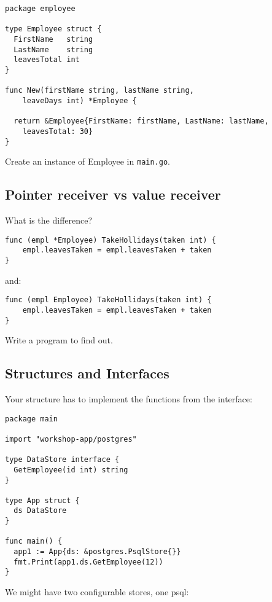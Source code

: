 \documentclass[11pt, letterpaper]{article}
\begin{document}
\begin{verbatim}
package employee

type Employee struct {
  FirstName   string
  LastName    string
  leavesTotal int
}

func New(firstName string, lastName string,
    leaveDays int) *Employee {

  return &Employee{FirstName: firstName, LastName: lastName,
    leavesTotal: 30}
}
\end{verbatim}

Create an instance of Employee in \verb|main.go|.

\subsection{Pointer receiver vs value receiver}

What is the difference?

\begin{verbatim}
func (empl *Employee) TakeHollidays(taken int) {
    empl.leavesTaken = empl.leavesTaken + taken
}
\end{verbatim}

and:

\begin{verbatim}
func (empl Employee) TakeHollidays(taken int) {
    empl.leavesTaken = empl.leavesTaken + taken
}
\end{verbatim}

Write a program to find out.

\subsection{Structures and Interfaces}

Your structure has to implement the functions from the interface:

\begin{verbatim}
package main

import "workshop-app/postgres"

type DataStore interface {
  GetEmployee(id int) string
}

type App struct {
  ds DataStore
}

func main() {
  app1 := App{ds: &postgres.PsqlStore{}}
  fmt.Print(app1.ds.GetEmployee(12))
}
\end{verbatim}

We might have two configurable stores, one psql:
\end{document}
